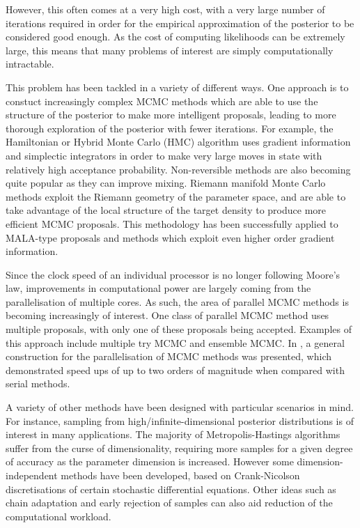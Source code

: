 \documentclass[final]{siamltex}
\begin{document}
However, this often comes at a very high cost, with a very large
number of iterations required in order for the empirical approximation
of the posterior to be considered good enough. As the cost of
computing likelihoods can be extremely large, this means that many
problems of interest are simply computationally intractable.

This problem has been tackled in a variety of different ways. One
approach is to constuct increasingly complex MCMC methods which are
able to use the structure of the posterior to make more intelligent
proposals, leading to more thorough exploration of the posterior with
fewer iterations. For example, the Hamiltonian or Hybrid Monte Carlo
(HMC) algorithm uses gradient information and simplectic integrators
in order to make very large moves in state with relatively high
acceptance probability\cite{sexton1992hamiltonian}. Non-reversible
methods are also becoming quite popular as they can improve
mixing\cite{bierkens2015non}. Riemann
manifold Monte Carlo methods exploit the Riemann geometry of the
parameter space, and are able to take advantage of the local structure
of the target density to produce more efficient MCMC
proposals\cite{girolami2011riemann}. This methodology has been
successfully applied to MALA-type proposals and methods which exploit
even higher order gradient information\cite{bui2014solving}.

Since the clock speed of an individual processor is no longer
following Moore's law\cite{moore1998cramming}, improvements in
computational power are largely coming from the parallelisation of
multiple cores. As such, the area of parallel MCMC methods is becoming
increasingly of interest. One class of parallel MCMC method uses
multiple proposals, with only one of these proposals being
accepted. Examples of this approach include multiple try
MCMC\cite{liu2000multiple} and ensemble MCMC\cite{neal2011mcmc}. In
\cite{calderhead2014general}, a general construction for the
parallelisation of MCMC methods was presented, which demonstrated
speed ups of up to two orders of magnitude when compared with serial
methods.

A variety of other methods have been designed with particular scenarios in mind. For
instance, sampling from high/infinite-dimensional
posterior distributions is of interest in many applications. The majority of
Metropolis-Hastings algorithms suffer from the curse of
dimensionality, requiring more samples for a given degree of accuracy
as the parameter dimension is increased. However some
dimension-independent methods have been developed, based on
Crank-Nicolson discretisations of certain stochastic differential
equations\cite{cotter2013mcmc}. Other ideas such as chain
adaptation\cite{haario2005componentwise} and early rejection of
samples can also aid reduction of the computational
workload\cite{solonen2012efficient}.
\end{document}
